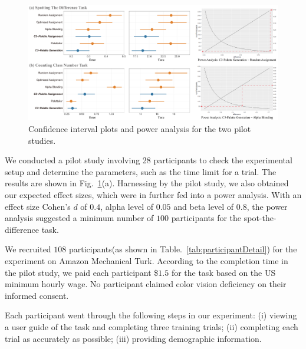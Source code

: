 \begin{figure}[t]
\centering
\includegraphics[width=1\linewidth]{figures/user-result-pilot.pdf}
\caption{Confidence interval plots and power analysis for the two pilot studies.
}
\vspace*{-3mm}
\label{fig:pilotResults}
\end{figure}

\vspace{.3em}
We conducted a pilot study involving 28 participants to check the experimental setup and determine the parameters, such as the time limit for a trial. The results are shown in Fig.~\ref{fig:pilotResults}(a).
Harnessing by the pilot study, we also obtained our expected effect sizes, which were in further fed into a power analysis. With an effect size Cohen's $d$ of $0.4$, alpha level of $0.05$ and beta level of $0.8$, the power analysis suggested a minimum number of $100$ participants for the spot-the-difference task. %


\vspace{.3em}
We recruited $108$ participants(as shown in Table.~\ref{tab:participantDetail}) for the experiment on Amazon Mechanical Turk.
According to the completion time in the pilot study, we paid each participant \$$1.5$ for the task based on the US minimum hourly wage.
No participant claimed color vision deficiency on their informed consent.

\vspace{.3em}
Each participant went through the following steps in our experiment: (i) viewing a user guide of the task and completing three training trials; (ii) completing each trial as accurately as possible; (iii) providing demographic information.

